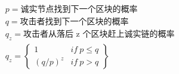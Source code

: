 \documentclass{article}
\begin{document}
\pagestyle{empty}

\begin{align*}
  & p = \text{诚实节点找到下一个区块的概率}            \\
  & q = \text{攻击者找到下一个区块的概率}              \\
  & q_z = \text{攻击者从落后 z 个区块赶上诚实链的概率} \\
  & q_z = \begin{Bmatrix}
  1         & if \ p \leq q \\
  (q / p)^z & if \ p > q    
 \end{Bmatrix}                    
\end{align*}
\end{document}
